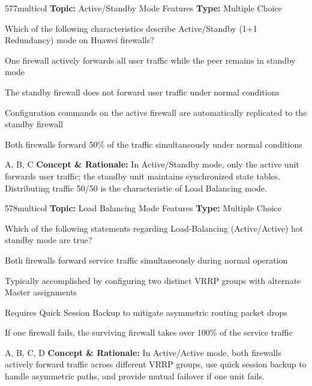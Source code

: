 \begin{qcard}{577}{multicol}
\textcolor{darkslate!75}{\small\textbf{Topic:} Active/Standby Mode Features \hfill \textbf{Type:} Multiple Choice}\vspace{0.4em}\par
Which of the following characteristics describe Active/Standby (1+1 Redundancy) mode on Huawei firewalls?
\begin{qoptions}
\item One firewall actively forwards all user traffic while the peer remains in standby mode
\item The standby firewall does not forward user traffic under normal conditions
\item Configuration commands on the active firewall are automatically replicated to the standby firewall
\item Both firewalls forward 50\% of the traffic simultaneously under normal conditions
\end{qoptions}
\end{qcard}
\nopagebreak
\begin{explainbox}{A, B, C}
\textbf{Concept \& Rationale:} In Active/Standby mode, only the active unit forwards user traffic; the standby unit maintains synchronized state tables. Distributing traffic 50/50 is the characteristic of Load Balancing mode.
\end{explainbox}

\begin{qcard}{578}{multicol}
\textcolor{darkslate!75}{\small\textbf{Topic:} Load Balancing Mode Features \hfill \textbf{Type:} Multiple Choice}\vspace{0.4em}\par
Which of the following statements regarding Load-Balancing (Active/Active) hot standby mode are true?
\begin{qoptions}
\item Both firewalls forward service traffic simultaneously during normal operation
\item Typically accomplished by configuring two distinct VRRP groups with alternate Master assignments
\item Requires Quick Session Backup to mitigate asymmetric routing packet drops
\item If one firewall fails, the surviving firewall takes over 100\% of the service traffic
\end{qoptions}
\end{qcard}
\nopagebreak
\begin{explainbox}{A, B, C, D}
\textbf{Concept \& Rationale:} In Active/Active mode, both firewalls actively forward traffic across different VRRP groups, use quick session backup to handle asymmetric paths, and provide mutual failover if one unit fails.
\end{explainbox}

